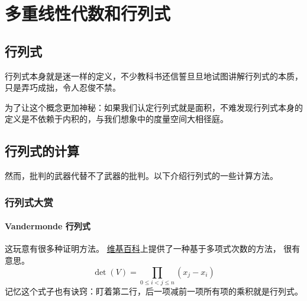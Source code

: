 \chapter{多重线性代数和行列式}




\section{行列式}

行列式本身就是迷一样的定义，不少教科书还信誓旦旦地试图讲解行列式的本质，只是弄巧成拙，令人忍俊不禁。

为了让这个概念更加神秘：如果我们认定行列式就是面积，不难发现行列式本身的定义是不依赖于内积的，与我们想象中的度量空间大相径庭。

\section{行列式的计算}
然而，批判的武器代替不了武器的批判。以下介绍行列式的一些计算方法。
\subsection{行列式大赏}
\subsubsection{Vandermonde 行列式}
这玩意有很多种证明方法。
\href{https://en.wikipedia.org/wiki/Vandermonde_matrix#First_proof:_Polynomial_properties}{维基百科}上提供了一种基于多项式次数的方法，
很有意思。
\[
    \det(V)=\prod _{0\leq i<j\leq n}(x_{j}-x_{i})
\]
记忆这个式子也有诀窍：盯着第二行，后一项减前一项所有项的乘积就是行列式。
